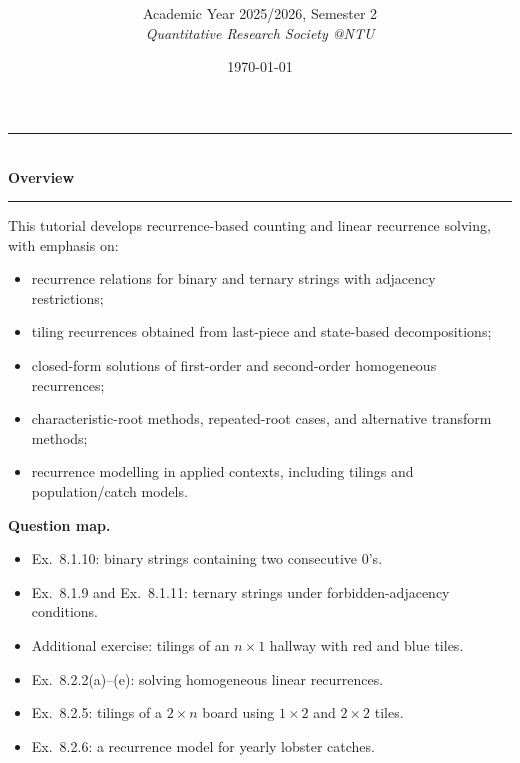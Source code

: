 \documentclass[12pt]{article}
\title{
\CourseCode \CourseName \\[0.3em]
\large \DocType
}
\author{
  Academic Year 2025/2026, Semester 2 \\[0.25em]
  \textit{Quantitative Research Society @NTU}
}
\date{\today}
\begin{document}
\maketitle
\thispagestyle{plainfirst}
\pagestyle{main}

\begin{center}
  \rule{0.82\textwidth}{0.4pt}\\[4pt]
  \textbf{Overview}\\[2pt]
  \rule{0.82\textwidth}{0.4pt}
\end{center}

\noindent
This tutorial develops recurrence-based counting and linear recurrence solving, with emphasis on:
\begin{itemize}[leftmargin=*]
  \item recurrence relations for binary and ternary strings with adjacency restrictions;
  \item tiling recurrences obtained from last-piece and state-based decompositions;
  \item closed-form solutions of first-order and second-order homogeneous recurrences;
  \item characteristic-root methods, repeated-root cases, and alternative transform methods;
  \item recurrence modelling in applied contexts, including tilings and population/catch models.
\end{itemize}

\noindent
\textbf{Question map.}
\begin{itemize}[leftmargin=*]
  \item Ex.\ 8.1.10: binary strings containing two consecutive $0$'s.
  \item Ex.\ 8.1.9 and Ex.\ 8.1.11: ternary strings under forbidden-adjacency conditions.
  \item Additional exercise: tilings of an $n\times 1$ hallway with red and blue tiles.
  \item Ex.\ 8.2.2(a)--(e): solving homogeneous linear recurrences.
  \item Ex.\ 8.2.5: tilings of a $2\times n$ board using $1\times 2$ and $2\times 2$ tiles.
  \item Ex.\ 8.2.6: a recurrence model for yearly lobster catches.
\end{itemize}

\newpage
\tableofcontents
\newpage
\end{document}
